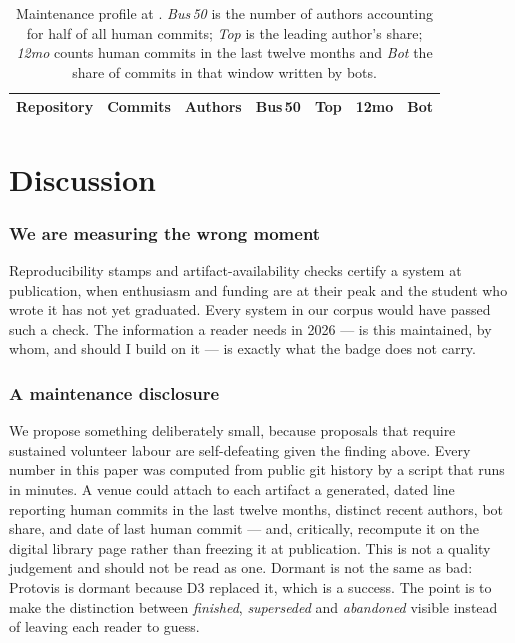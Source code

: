 \documentclass[9pt,twocolumn,letterpaper]{article}
\begin{document}
\begin{table}[t]
\centering
\caption{Maintenance profile at \snapshot{}. \emph{Bus\,50} is the number of
authors accounting for half of all human commits; \emph{Top} is the leading
author's share; \emph{12mo} counts human commits in the last twelve months and
\emph{Bot} the share of commits in that window written by bots.}
\label{tab:maintenance}
\small
\begin{tabular}{@{}lrrrrrr@{}}
\toprule
Repository & Commits & Authors & Bus\,50 & Top & 12mo & Bot \\
\midrule

\end{tabular}
\end{table}

\section{Discussion}

\subsubsection{We are measuring the wrong moment}
Reproducibility stamps and artifact-availability checks certify a system at
publication, when enthusiasm and funding are at their peak and the student who
wrote it has not yet graduated. Every system in our corpus would have passed
such a check. The information a reader needs in 2026 --- is this maintained, by
whom, and should I build on it --- is exactly what the badge does not carry.

\subsubsection{A maintenance disclosure}
We propose something deliberately small, because proposals that require
sustained volunteer labour are self-defeating given the finding above. Every
number in this paper was computed from public git history by a script that runs
in minutes. A venue could attach to each artifact a generated, dated line
reporting human commits in the last twelve months, distinct recent authors, bot
share, and date of last human commit --- and, critically, recompute it on the
digital library page rather than freezing it at publication. This is not a
quality judgement and should not be read as one. Dormant is not the same as
bad: Protovis is dormant because D3 replaced it, which is a success. The point
is to make the distinction between \emph{finished}, \emph{superseded} and
\emph{abandoned} visible instead of leaving each reader to guess.
\end{document}
